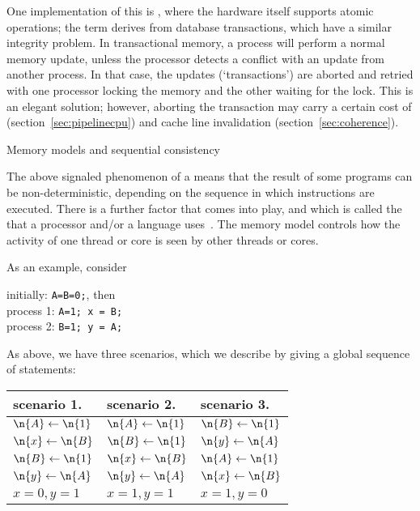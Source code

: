 One implementation of
this is , where the hardware itself
supports atomic operations; the term derives from database
transactions, which have a similar integrity problem. In transactional
memory, a process will perform a normal memory update, unless the
processor detects a conflict with an update from another process. In
that case, the updates (`transactions') are aborted and retried with
one processor locking the memory and the other waiting for the
lock. This is an elegant solution; however, aborting the transaction
may carry a certain cost of 
(section~\ref{sec:pipelinecpu}) and
cache line invalidation (section~\ref{sec:coherence}).


 {Memory models and sequential consistency}
\label{sec:seq-consist}

The above signaled phenomenon of a 
means that the result of some programs can be non-deterministic,
depending on the sequence in which instructions are executed.
There is a further factor that comes into play, and which is
called the  that a processor and/or a
language uses~\cite{AdveBoehm:memorymodels}.
The memory model controls how the activity of one thread or core
is seen by other threads or cores.

As an example, consider
\begin{tabbing}
  initially: \texttt{A=B=0;}, then\\
  process 1: \texttt{A=1; x = B;}\\
  process 2: \texttt{B=1; y = A;}
\end{tabbing}
As above, we have three scenarios, which we describe by
giving a global sequence of statements:

\begin{tabular}{|l|l|l|}
  \hline
  scenario 1.& scenario 2.& scenario 3.\\ \hline
  $\n{A}\leftarrow \n{1}$&$\n{A}\leftarrow \n{1}$&$\n{B}\leftarrow \n{1}$\\
  $\n{x}\leftarrow \n{B}$&$\n{B}\leftarrow \n{1}$&$\n{y}\leftarrow \n{A}$\\
  $\n{B}\leftarrow \n{1}$&$\n{x}\leftarrow \n{B}$&$\n{A}\leftarrow \n{1}$\\
  $\n{y}\leftarrow \n{A}$&$\n{y}\leftarrow \n{A}$&$\n{x}\leftarrow \n{B}$\\
  \hline
  $x=0, y=1$& $x=1,y=1$& $x=1,y=0$\\
  \hline
\end{tabular}

